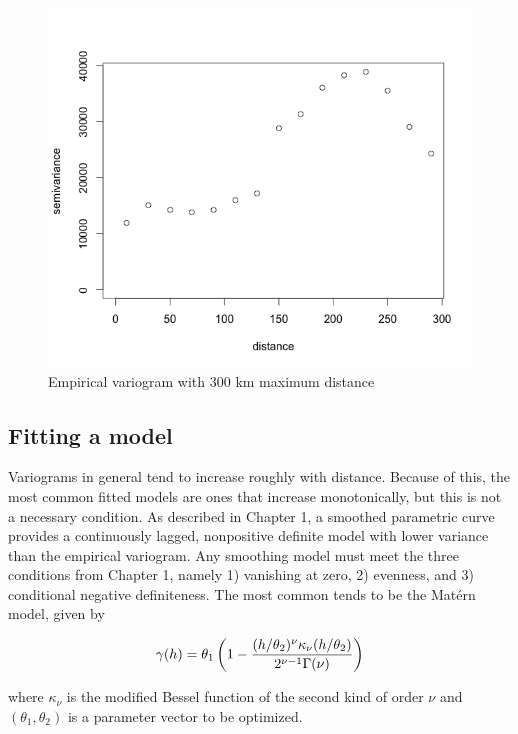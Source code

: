 \documentclass[12pt,twoside]{reedthesis}
\begin{document}
\begin{figure}[h]
	   
	       \centering
	  
	    \includegraphics[scale=0.6]{Variogram}
	
	     \caption{Empirical variogram with 300 km maximum distance}
	 \label{variogram}
	\end{figure}

\subsection{Fitting a model}

Variograms in general tend to increase roughly with distance. Because of this, the most common fitted models are ones that increase monotonically, but this is not a necessary condition. As described in Chapter 1, a smoothed parametric curve provides a continuously lagged, nonpositive definite model with lower variance than the empirical variogram. Any smoothing model must meet the three conditions from Chapter 1, namely 1) vanishing at zero, 2) evenness, and 3) conditional negative definiteness. The most common tends to be the Mat\'ern model, given by 

\begin{align*}
\gamma(h) = \theta_1\left (1-{{(h/\theta_2)^\nu\kappa_{\nu}(h/\theta_2)}\over{2^{\nu-1}\Gamma(\nu)}} \right )
\end{align*}

where $\kappa_\nu$ is the modified Bessel function of the second kind of order $\nu$ \cite{gelfand:2010} and $(\theta_1, \theta_2)$ is a parameter vector to be optimized. \\
\end{document}
